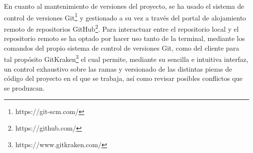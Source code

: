En cuanto al mantenimiento de versiones del proyecto, se ha usado el sistema de control de versiones Git\footnote{https://git-scm.com/} y gestionado a su vez a través del portal de alojamiento remoto de repositorios GitHub\footnote{https://github.com/}. Para interactuar entre el repositorio local y el repositorio remoto se ha optado por hacer uso tanto de la terminal, mediante los comandos del propio sistema de control de versiones Git, como del cliente para tal propósito GitKraken\footnote{https://www.gitkraken.com/} el cual permite, mediante su sencilla e intuitiva interfaz, un control exhaustivo sobre las ramas y versionado de las distintas piezas de código del proyecto en el que se trabaja, así como revisar posibles conflictos que se produzcan.

